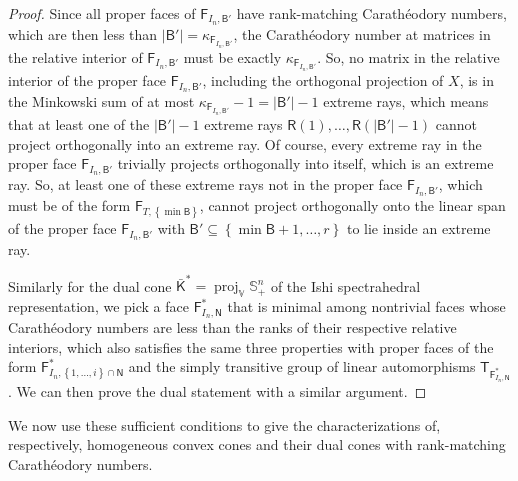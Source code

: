 \documentclass[oneside]{amsart}
\theoremstyle{plain}
\theoremstyle{definition}
\theoremstyle{remark}
\numberwithin{equation}{section}
\DeclareMathOperator{\proj}{proj}
\begin{document}
\begin{proof}
Since all proper faces of $\mathsf{F}_{I_{n},\mathsf{B}'}$ have
rank-matching Carath\'eodory numbers, which are then less than $\lvert
\mathsf{B}' \rvert = \kappa_{\mathsf{F}_{I_{n},\mathsf{B}'}}$, the
Carath\'eodory number at matrices in the relative interior of
$\mathsf{F}_{I_{n},\mathsf{B}'}$ must be exactly
$\kappa_{\mathsf{F}_{I_{n},\mathsf{B}'}}$. So, no matrix in the relative
interior of the proper face $\mathsf{F}_{I_{n},\mathsf{B}'}$, including the
orthogonal projection of $X$, is in the Minkowski sum of at most
$\kappa_{\mathsf{F}_{I_{n},\mathsf{B}'}} - 1 = \lvert \mathsf{B}' \rvert -
1$ extreme rays, which means that at least one of the $\lvert \mathsf{B}'
\rvert - 1$ extreme rays $\mathsf{R}(1), \dotsc, \mathsf{R}(\lvert
\mathsf{B}' \rvert - 1)$ cannot project orthogonally into an extreme ray.
Of course, every extreme ray in the proper face
$\mathsf{F}_{I_{n},\mathsf{B}'}$ trivially projects orthogonally into
itself, which is an extreme ray. So, at least one of these extreme rays not
in the proper face $\mathsf{F}_{I_{n},\mathsf{B}'}$, which must be of the
form $\mathsf{F}_{T,\left\{\min \mathsf{B}\right\}}$, cannot project
orthogonally onto the linear span of the proper face
$\mathsf{F}_{I_{n},\mathsf{B}'}$ with $\mathsf{B}' \subseteq \left\{\min
\mathsf{B}+1, \dotsc, r\right\}$ to lie inside an extreme ray.

Similarly for the dual cone $\bar{\mathsf{K}}^{*} = \proj_{\mathbb{V}}
\mathbb{S}^{n}_{+}$ of the Ishi spectrahedral representation, we pick a
face $\mathsf{F}^{*}_{I_{n},\mathsf{N}}$ that is minimal among nontrivial
faces whose Carath\'eodory numbers are less than the ranks of their
respective relative interiors, which also satisfies the same three
properties with proper faces of the form $\mathsf{F}^{*}_{I_{n},\left\{1,
\dotsc, i\right\} \cap \mathsf{N}}$ and the simply transitive group of
linear automorphisms $\mathsf{T}_{\mathsf{F}^{*}_{I_{n},\mathsf{N}}}$. We
can then prove the dual statement with a similar argument.
\end{proof}

We now use these sufficient conditions to give the characterizations of,
respectively, homogeneous convex cones and their dual cones with
rank-matching Carath\'eodory numbers.
\end{document}

